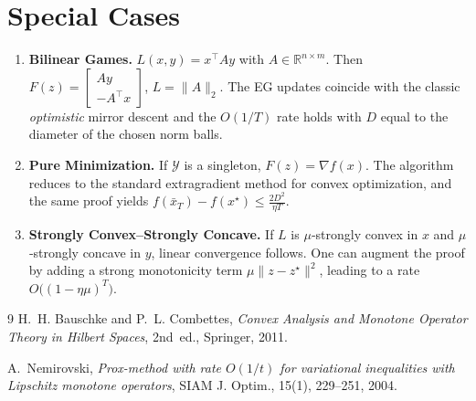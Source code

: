 \documentclass{article}
\begin{document}
\section*{Special Cases}
\begin{enumerate}[label=\arabic*)]
\item \textbf{Bilinear Games.} $L(x,y)=x^{\top}Ay$ with $A\in\mathbb{R}^{n\times m}$. Then $F(z)=\begin{bmatrix}A y \\ -A^{\top}x\end{bmatrix}$, $L=\|A\|_{2}$. The EG updates coincide with the classic \emph{optimistic} mirror descent and the $O(1/T)$ rate holds with $D$ equal to the diameter of the chosen norm balls.
\item \textbf{Pure Minimization.} If $\mathcal{Y}$ is a singleton, $F(z)=\nabla f(x)$. The algorithm reduces to the standard extragradient method for convex optimization, and the same proof yields $f(\bar x_{T})-f(x^{\star})\le\frac{2D^{2}}{\eta T}$.
\item \textbf{Strongly Convex–Strongly Concave.} If $L$ is $\mu$‑strongly convex in $x$ and $\mu$‑strongly concave in $y$, linear convergence follows. One can augment the proof by adding a strong monotonicity term $\mu\|z-z^{\star}\|^{2}$, leading to a rate $O\bigl((1-\eta\mu)^{T}\bigr)$.
\end{enumerate}

\begin{thebibliography}{9}
H.~H. Bauschke and P.~L. Combettes, \emph{Convex Analysis and Monotone Operator Theory in Hilbert Spaces}, 2nd~ed., Springer, 2011.

A.~Nemirovski, \emph{Prox-method with rate $O(1/t)$ for variational inequalities with Lipschitz monotone operators}, SIAM J. Optim., 15(1), 229–251, 2004.
\end{thebibliography}
\end{document}
